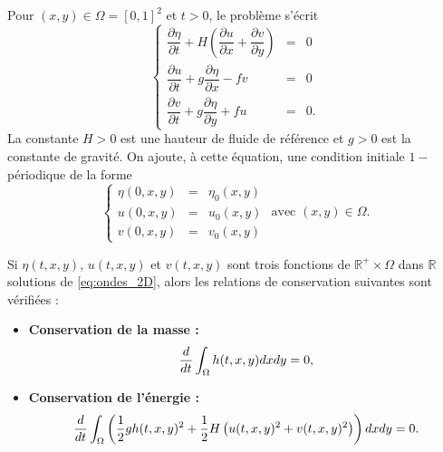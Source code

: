 Pour $(x,y) \in \Omega = [0,1]^2$ et $t>0$, le problème s'écrit 
\begin{equation}
\left\lbrace
\begin{array}{rcl}
\dfrac{\partial \eta}{\partial t} + H \left( \dfrac{\partial u}{\partial x} + \dfrac{\partial v}{\partial y} \right) & = & 0 \\
\dfrac{\partial u}{\partial t} + g \dfrac{\partial \eta}{\partial x} - f v & = & 0 \\
\dfrac{\partial v}{\partial t} + g \dfrac{\partial \eta}{\partial y} + f u & = & 0.
\end{array}
\right.
\label{eq:ondes_2D}
\end{equation}
La constante $H>0$ est une hauteur de fluide de référence et $g>0$ est la constante de gravité.
On ajoute, à cette équation, une condition initiale $1-$périodique de la forme
\begin{equation}
\left\lbrace
\begin{array}{rcl}
\eta(0,x,y) & = & \eta_0(x,y)\\
u(0,x,y) & = & u_0(x,y)\\
v(0,x,y) & = & v_0(x,y)
\end{array}
\right. \text{ avec } (x,y) \in \Omega. 
\end{equation}


\begin{proposition}
Si $\eta(t,x,y)$, $u(t,x,y)$ et $v(t,x,y)$ sont trois fonctions de $\mathbb{R}^+ \times \Omega$ dans $\mathbb{R}$ solutions de \eqref{eq:ondes_2D}, alors les relations de conservation suivantes sont vérifiées :
\begin{itemize}
\item \textbf{Conservation de la masse :}
\begin{equation}
\dfrac{d}{dt} \displaystyle\int_{\Omega} h(t,x,y)dxdy = 0,
\end{equation}
\item \textbf{Conservation de l'énergie :}
\begin{equation}
\dfrac{d}{dt} \displaystyle\int_{\Omega} \left( \dfrac{1}{2} g h(t,x,y)^2 + \dfrac{1}{2} H \left( u(t,x,y)^2 + v(t,x,y)^2 \right) \right) dxdy = 0.
\end{equation}
\end{itemize}
\end{proposition}

